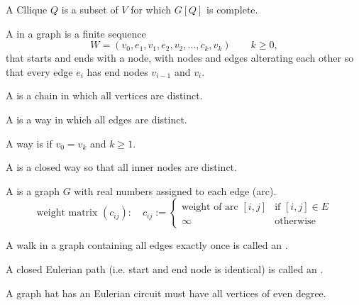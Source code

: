 \begin{defn}
  A Cllique $Q$ is a subset of $V$ for which $G[Q]$ is complete.
\end{defn}

\begin{defn}
  A  in a graph is a finite sequence \[
    W = (v_0,e_1,v_1,e_2,v_2, \ldots, c_k, v_k) \qquad k \geq 0,
  \]
  that starts and ends with a node, with nodes and edges alterating each other so that every edge $e_i$ has end nodes $v_{i-1}$ and $v_i$.
\end{defn}

\begin{defn}
  A  is a chain in which all vertices are distinct. 
\end{defn}

\begin{defn}
  A  is a way in which all edges are distinct.
\end{defn}

\begin{defn}
  A way is  if $v_0 = v_k$ and $k \geq 1$.
\end{defn}

\begin{defn}
  A  is a closed way so that all inner nodes are distinct.
\end{defn}

\begin{defn}
  A  is a graph $G$ with real numbers assigned to each edge (arc).
  \[
    \text{weight matrix } (c_{ij}): \quad c_{ij}:=
    \begin{cases}
      \text{weight of arc } [i,j]& \text{if } [i,j] \in E \\
      \infty & \text{otherwise}
    \end{cases}
  \]
\end{defn}

\begin{defn}
  A walk in a graph containing all edges exactly once is called an .
\end{defn}

\begin{defn}
  A closed Eulerian path (i.e. start and end node is identical) is called an .
\end{defn}

\begin{thm}
  A graph hat has an Eulerian circuit must have all vertices of even degree.
\end{thm}

